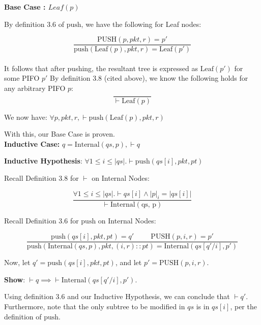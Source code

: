 \documentclass{article}
\begin{document}
\textbf{Base Case : $Leaf(p)$}\newline

By definition 3.6 of $\text{push}$, we have the following for Leaf nodes:

$$\frac{\text{PUSH}(p, pkt, r) = p'}{\text{push}(\text{Leaf}(p), pkt, r) = \text{Leaf}(p')}$$\\[-10pt]

It follows that after pushing, the resultant tree is expressed as $\text{Leaf}(p')$ for some PIFO $p'$ By definition 3.8 (cited above), we know the following holds for any arbitrary PIFO $p$:\\[-10pt]

$$\frac{}{\vdash \text{Leaf}(p)}$$

We now have: $\forall p, pkt, r, \vdash \text{push}(\text{Leaf}(p), pkt, r)$\newline

With this, our Base Case is proven.\\[10pt]

\textbf{Inductive Case:} $q = \text{Internal}(qs, p), \vdash q$\newline

\textbf{Inductive Hypothesis}: $\forall 1 \leq i \leq |qs|. \vdash \text{push}(qs[i], pkt, pt)$\newline

Recall Definition 3.8 for $\vdash$ on Internal Nodes:

$$\frac{\forall 1 \leq i \leq |qs|. \vdash qs[i] \land |p|_i = |qs[i]|}{\vdash \text{Internal}(\text{qs, p})}$$\newline

Recall Definition 3.6 for $\text{push}$ on Internal Nodes:

$$\frac{\text{push}(qs[i], pkt, pt) = q' \hspace{1cm} \text{PUSH}(p, i, r) = p'}{\text{push}(\text{Internal}(qs, p), pkt, (i, r) :: pt) = \text{Internal}(qs[q'/i], p')}$$\newline

Now, let $q' = \text{push}(qs[i], pkt, pt)$, and let $p' = \text{PUSH}(p, i, r)$.\newline

\textbf{Show}: $\vdash q \implies \vdash \text{Internal}(qs[q'/i], p')$.\newline

Using definition 3.6 and our Inductive Hypothesis, we can conclude that $\vdash q'$. Furthermore, note that the only subtree to be modified in $qs$ is in $qs[i]$, per the definition of $\text{push}$.\newline
\end{document}

